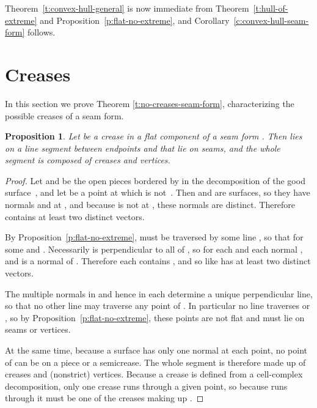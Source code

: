 \documentclass{article}
\newtheorem{lemma}[theorem]{Lemma}
\newtheorem{proposition}[theorem]{Proposition}
\newcommand\comment[1]{}
\begin{document}
Theorem~\ref{t:convex-hull-general} is now immediate from
Theorem~\ref{t:hull-of-extreme} and Proposition~\ref{p:flat-no-extreme},
and Corollary~\ref{c:convex-hull-seam-form} follows.



\section{Creases}
\label{sec:creases}

In this section we prove Theorem \ref{t:no-creases-seam-form},
characterizing the possible creases of a seam form.

\comment{
\begin{lemma}\label{l:gauss-map-closed}
  For a convex body , the Gauss ``map'' , regarded as a relation
  in , is a closed set.
\end{lemma}
\begin{proof}
  We need to show that if points  converge to
  , and normals  to  respectively converge to , then  is a
  normal to .  We have  for each .  By continuity,  converges to .  Because  is bounded, the functions  converge uniformly to , and the
  right-hand sides  converge to
  .  Consequently  and  as required.
\end{proof}
}

\begin{proposition}\label{p:flat-crease-segment}
  Let  be a crease in a flat component of a seam form .
  Then  lies on a line segment  between endpoints  and 
  that lie on seams, and the whole segment is composed of creases and vertices.
\end{proposition}
\begin{proof}
  Let  and  be the open pieces bordered by 
  in the decomposition of the good surface~,
  and let  be a point at which  is not~.
  Then  and  are  surfaces,
  so they have normals  and  at ,
  and because  is not  at , these normals are distinct.
  Therefore  contains at least two distinct vectors.

  By Proposition~\ref{p:flat-no-extreme},  must be traversed by
  some line , so that  for some  and .
  Necessarily  is perpendicular to all of ,
  so for each  and each normal ,
   and  is a
  normal of .  Therefore each  contains , and
  so like  has at least
  two distinct vectors.

  The multiple normals in  and hence in each  determine a unique perpendicular line, so
  that no other line may traverse any point of .  In
  particular no line traverses  or , so by
  Proposition~\ref{p:flat-no-extreme}, these points are not flat and
  must lie on seams or vertices.

  At the same time, because a  surface has only one normal at
  each point, no point of  can be on a  piece or a
  semicrease.  The whole segment is therefore made up of creases and
  (nonstrict) vertices.  Because a crease is defined from a
  cell-complex decomposition, only one crease runs through a given
  point, so because  runs through  it must be one of the
  creases making up .
\end{proof}
\end{document}
